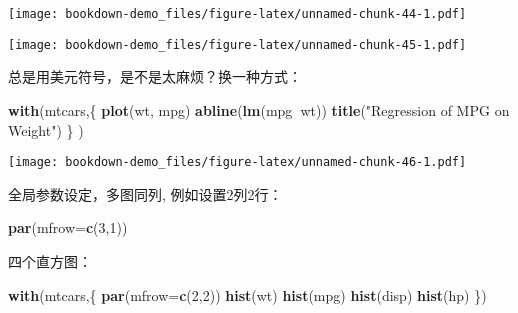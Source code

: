 \documentclass[]{book}
\newenvironment{Shaded}{\begin{snugshade}}{\end{snugshade}}
\newcommand{\DataTypeTok}[1]{\textcolor[rgb]{0.13,0.29,0.53}{#1}}
\newcommand{\DecValTok}[1]{\textcolor[rgb]{0.00,0.00,0.81}{#1}}
\newcommand{\KeywordTok}[1]{\textcolor[rgb]{0.13,0.29,0.53}{\textbf{#1}}}
\newcommand{\NormalTok}[1]{#1}
\newcommand{\OperatorTok}[1]{\textcolor[rgb]{0.81,0.36,0.00}{\textbf{#1}}}
\newcommand{\StringTok}[1]{\textcolor[rgb]{0.31,0.60,0.02}{#1}}
\begin{document}
\texttt{[image: bookdown-demo\_files/figure-latex/unnamed-chunk-44-1.pdf]}

\begin{Shaded}
\end{Shaded}

\texttt{[image: bookdown-demo\_files/figure-latex/unnamed-chunk-45-1.pdf]}

总是用美元符号，是不是太麻烦？换一种方式：

\begin{Shaded}
\begin{Highlighting}[]
\KeywordTok{with}\NormalTok{(mtcars,\{}
\KeywordTok{plot}\NormalTok{(wt, mpg)}
\KeywordTok{abline}\NormalTok{(}\KeywordTok{lm}\NormalTok{(mpg}\OperatorTok{~}\NormalTok{wt))}
\KeywordTok{title}\NormalTok{(}\StringTok{"Regression of MPG on Weight"}\NormalTok{)}
\NormalTok{\}}
\NormalTok{)}
\end{Highlighting}
\end{Shaded}

\texttt{[image: bookdown-demo\_files/figure-latex/unnamed-chunk-46-1.pdf]}

全局参数设定，多图同列, 例如设置2列2行：

\begin{Shaded}
\begin{Highlighting}[]
\KeywordTok{par}\NormalTok{(}\DataTypeTok{mfrow=}\KeywordTok{c}\NormalTok{(}\DecValTok{3}\NormalTok{,}\DecValTok{1}\NormalTok{))}
\end{Highlighting}
\end{Shaded}

四个直方图：

\begin{Shaded}
\begin{Highlighting}[]
\KeywordTok{with}\NormalTok{(mtcars,\{}
  \KeywordTok{par}\NormalTok{(}\DataTypeTok{mfrow=}\KeywordTok{c}\NormalTok{(}\DecValTok{2}\NormalTok{,}\DecValTok{2}\NormalTok{))}
  \KeywordTok{hist}\NormalTok{(wt)}
  \KeywordTok{hist}\NormalTok{(mpg)}
  \KeywordTok{hist}\NormalTok{(disp)}
  \KeywordTok{hist}\NormalTok{(hp)}
\NormalTok{\})}
\end{Highlighting}
\end{Shaded}
\end{document}
